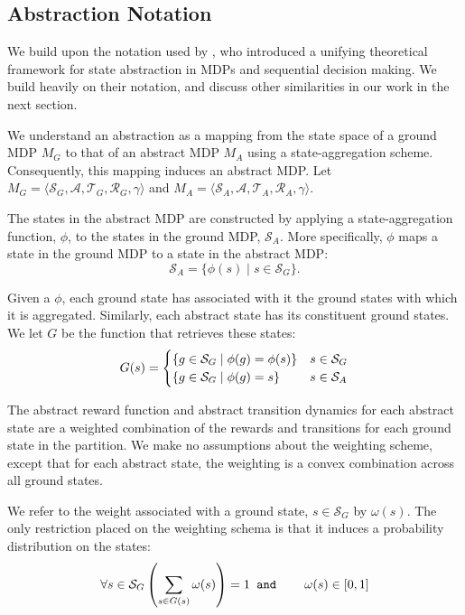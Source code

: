 \subsection{Abstraction Notation}
We build upon the notation used by \citeauthor{li2006towards}, who introduced a unifying theoretical framework for state abstraction in \acp{MDP} and sequential decision making. We build heavily on their notation, and discuss other similarities in our work in the next section.

We understand an abstraction as a mapping from the state space of a ground MDP $M_G$ to that of an abstract MDP $M_A$ using a state-aggregation scheme. Consequently, this mapping induces an abstract MDP. Let $M_G = \langle \mathcal{S}_G, \mathcal{A}, \mathcal{T}_G, \mathcal{R}_G, \gamma \rangle$ and $M_A = \langle \mathcal{S}_A, \mathcal{A}, \mathcal{T}_A, \mathcal{R}_A, \gamma \rangle$.
\edefn

The states in the abstract \ac{MDP} are constructed by applying a state-aggregation function, $\phi$, to the states in the ground \ac{MDP}, $\mathcal{S}_A$. More specifically, $\phi$ maps a state in the ground \ac{MDP} to a state in the abstract \ac{MDP}:
\begin{equation}
\mathcal{S}_A = \{ \phi(s) \mid s \in \mathcal{S}_G\}.
\end{equation}
\edefn

Given a $\phi$, each ground state has associated with it the ground states with which it is aggregated. Similarly, each abstract state has its constituent ground states. We let $G$ be the function that retrieves these states:
\begin{equation}
G(s)=
\begin{cases}
\{g \in \mathcal{S}_G \mid \phi(g) = \phi(s) \}& s \in \mathcal{S}_G\\
\{g \in \mathcal{S}_G \mid \phi(g)=s \}& s \in \mathcal{S}_A
\end{cases}
\end{equation}
\edefn

The abstract reward function and abstract transition dynamics for each abstract state are a weighted combination of the rewards and transitions for each ground state in the partition. We make no assumptions about the weighting scheme, except that for each abstract state, the weighting is a convex combination across all ground states.

We refer to the weight associated with a ground state, $s \in \mathcal{S}_G$ by $\omega(s)$. The only restriction placed on the weighting schema is that it induces a probability distribution on the states:
\begin{equation}
\forall s \in \mathcal{S}_G \left(\sum_{s \in G(s)} \omega(s)\right) = 1 \texttt{ and }\hspace{6mm}  \omega(s) \in [0,1]
\end{equation}
\edefn

